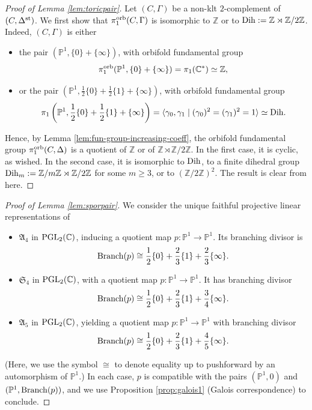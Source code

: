 \documentclass{amsart}
\newcommand{\pp}{\mathbb{P}}
\newcommand{\zz}{\mathbb{Z}}
\newcommand{\cc}{\mathbb{C}}
\theoremstyle{definition}
\theoremstyle{remark}
\numberwithin{equation}{section}
\begin{document}
\begin{proof}[Proof of Lemma \ref{lem:toricpair}]
Let $(C,\Gamma)$ be a non-klt $2$-complement of $(C,\Delta^{\rm st})$. 
We first show that $\pi_1^{\rm orb}(C,\Gamma)$ is isomorphic to $\zz$ or to ${\rm Dih}:=\zz\rtimes\zz/2\zz$. 
Indeed, $(C,\Gamma)$ is either 
\begin{itemize}
    \item the pair $(\pp^1,\{0\}+\{\infty\})$, with orbifold fundamental group
$$\pi_1^{\rm orb}(\pp^1,\{0\}+\{\infty\}) = \pi_1(\cc^*)\simeq \mathbb{Z},$$
\item or the pair $(\mathbb{P}^1,\frac{1}{2}\{0\}+\frac{1}{2}\{1\}+\{\infty\})$, with orbifold fundamental group
$$\pi_1\left(\mathbb{P}^1,\frac{1}{2}\{0\}+\frac{1}{2}\{1\}+\{\infty\}\right)=\langle \gamma_0,\gamma_1\mid (\gamma_0)^2=(\gamma_1)^2=1\rangle\simeq {\rm Dih}.$$
\end{itemize}

Hence, by Lemma \ref{lem:fun-group-increasing-coeff}, the orbifold fundamental group $\pi_1^{\rm orb}(C,\Delta)$ is a quotient of $\zz$ or of $\zz\rtimes \zz/2\zz$. In the first case, it is cyclic, as wished. In the second case, it is isomorphic to ${\rm Dih}$, to a finite dihedral group ${\rm Dih}_m:=\zz/m\zz\rtimes \zz/2\zz$ for some $m\ge 3$, or to $(\zz/2\zz)^2$. The result is clear from here.
\end{proof}




\begin{proof}[Proof of Lemma \ref{lem:sporpair}]
We consider the unique faithful projective linear representations of
\begin{itemize}
    \item $\mathfrak{A}_4$ in ${\rm PGL}_2(\cc)$, inducing a quotient map $p:\pp^1\to \pp^1$. Its branching divisor is
    $${\rm Branch}(p)\cong\frac{1}{2}\{0\}+\frac{2}{3}\{1\}+\frac{2}{3}\{\infty\}.$$
    \item $\mathfrak{S}_4$ in ${\rm PGL}_2(\cc)$, with a quotient map $p:\pp^1\to \pp^1$. It has branching divisor
    $${\rm Branch}(p)\cong\frac{1}{2}\{0\}+\frac{2}{3}\{1\}+\frac{3}{4}\{\infty\}.$$
    \item $\mathfrak{A}_5$ in ${\rm PGL}_2(\cc)$, yielding a quotient map $p:\pp^1\to \pp^1$ with branching divisor
    $${\rm Branch}(p)\cong\frac{1}{2}\{0\}+\frac{2}{3}\{1\}+\frac{4}{5}\{\infty\}.$$
\end{itemize}
 (Here, we use the symbol $\cong$ to denote equality up to pushforward by an automorphism of $\pp^1$.) In each case, $p$ is compatible with the pairs $(\pp^1,0)$ and $(\pp^1,{\rm Branch}(p))$, and we use Proposition \ref{prop:galois1} (Galois correspondence) to conclude.
\end{proof}
\end{document}
